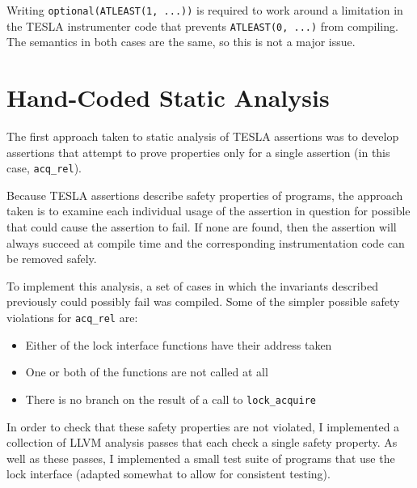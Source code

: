 Writing \texttt{optional(ATLEAST(1, ...))} is required to work around a
limitation in the TESLA instrumenter code that prevents
\texttt{ATLEAST(0, ...)} from compiling. The semantics in both cases are
the same, so this is not a major issue.

\section{Hand-Coded Static Analysis}

The first approach taken to static analysis of TESLA assertions was to develop
 assertions that attempt to prove properties only for a
single assertion (in this case, \texttt{acq_rel}).

Because TESLA assertions describe safety properties of programs, the approach
taken is to examine each individual usage of the assertion in question for
possible  that could cause the assertion to fail. If none
are found, then the assertion will always succeed at compile time and the
corresponding instrumentation code can be removed safely.

To implement this analysis, a set of cases in which the invariants described
previously could possibly fail was compiled. Some of the simpler possible safety
violations for \texttt{acq_rel} are:
\begin{itemize}
  \item Either of the lock interface functions have their address taken
  \item One or both of the functions are not called at all
  \item There is no branch on the result of a call to
  \texttt{lock_acquire}
\end{itemize}

In order to check that these safety properties are not violated, I implemented a
collection of LLVM \cite{lattner_llvm:_2002} analysis passes that each check a
single safety property. As well as these passes, I implemented a small test
suite of programs that use the lock interface (adapted somewhat to allow for
consistent testing).

